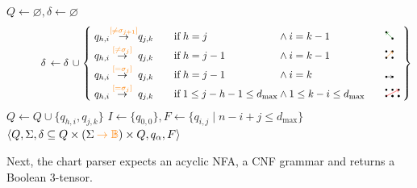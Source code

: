 \documentclass[popl.tex]{subfiles}
\begin{document}
\begin{algorithm}[H]
\caption{\texttt{lev\_build} pseudocode}
\label{alg:lev_build}
\begin{algorithmic}[1]
   
  \State $Q \gets \varnothing, \delta \gets \varnothing$
    \State \vspace{-1.65cm}\[\hspace{1.15cm}\delta\,\gets \delta\,\cup\:\!\left\{
        \begin{alignedat}{9}
          &\;& q_{h,i} &\hspace{-0.1cm}\overset{{\color{orange}[\neq\sigma_{j+1}]}}{\rightarrow} &q_{j,k} &\qquad& \text{if}\;& h = j   &\:\land\:& i = k-1  &\qquad& \duparrow\\[-2pt]
          && q_{h,i}   &\overset{{\color{orange}[\neq\sigma_j]}}{\rightarrow} &q_{j,k} &&       \text{if}\;& h = j-1 &\:\land\:& i = k-1  &&       \ddiagarrow\\[-2pt]
          && q_{h,i}   &\overset{{\color{orange}[=\sigma_j]}}{\rightarrow}    &q_{j,k} &&       \text{if}\;& h = j-1 &\:\land\:& i = k    &&       \drightarrow\\[-2pt]
          && q_{h,i}   &\overset{{\color{orange}[=\sigma_j]}}{\rightarrow}    &q_{j,k} &&       \text{if}\;& 1 \leq j - h - 1 \leq d_{\max} &\:\land\:& 1 \leq k - i \leq d_{\max}   && \knightarrow\;
        \end{alignedat}
      \right\}\]
    \State $Q \gets Q \cup \{q_{h,i}, q_{j,k}\}$
  \EndFor
  \State $I \gets \{q_{0,0}\}, F \gets \{q_{i, j} \mid n - i + j \leq d_{\max}\}$
  \State \Return $\langle Q, \Sigma, \delta \subseteq Q \times (\Sigma\:{\color{orange}\rightarrow \mathbb{B}}) \times Q, q_\alpha, F\rangle$  
\EndProcedure
\end{algorithmic}
\end{algorithm}\vspace{-0.2cm}

\noindent Next, the chart parser expects an acyclic NFA, a CNF grammar and returns a Boolean 3-tensor.
\end{document}
